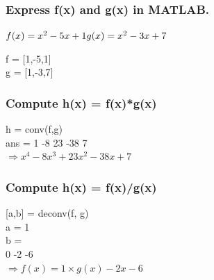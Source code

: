 \documentclass[12pt,a4paper]{article}
\begin{document}
\subsubsection{Express f(x) and g(x) in MATLAB.} 

$f(x) = x^2-5x+1\\
g(x) = x^2-3x+7$

f = [1,-5,1]\\
g = [1,-3,7]

\subsubsection{Compute h(x) = f(x)*g(x)} 

h = conv(f,g)\\
ans = 1   -8   23  -38    7\\
$\Longrightarrow x^4-8x^3+23x^2-38x+7$

\subsubsection{Compute h(x) = f(x)/g(x)} 

[a,b] = deconv(f, g)\\
a =  1\\
b =\\
0  -2  -6\\
$\Longrightarrow f(x) = 1\times g(x) -2x-6$
\end{document}
